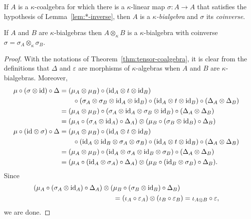 \begin{defn}
    If $A$ is a $\kappa$-coalgebra for which there is a $\kappa$-linear map $\sigma\colon A\to A$ that satisfies the hypothesis of Lemma~\ref{lem:*-inverse}, then $A$ is a \textsl{$\kappa$-bialgebra} and $\sigma$ its \textsl{coinverse}.
\end{defn}

\begin{thm}\label{thm:tensor-bialgebra}
    If\/ $A$ and\/ $B$ are\/ $\kappa$-bialgebras then\/ $A\otimes_\kappa B$ is a\/ $\kappa$-bialgebra with coinverse\/ $\sigma=\sigma_A\otimes_\kappa\sigma_B$.
\end{thm}

\begin{proof}
    With the notations of Theorem~\ref{thm:tensor-coalgebra}, it is clear from the definitions that $\Delta$ and $\varepsilon$ are morphisms of $\kappa$-algebras when $A$ and $B$ are $\kappa$-bialgebras. Moreover,
    \begin{align*}
        \mu\circ(\sigma\otimes\text{\rm id})\circ\Delta
            &= (\mu_A\otimes\mu_B)\circ(\text{\rm id}_A\otimes t\otimes\text{\rm id}_B)\\
            &\qquad\circ(\sigma_A\otimes\sigma_B
                    \otimes\text{\rm id}_A\otimes\text{\rm id}_B)
                \circ(\text{\rm id}_A\otimes t\otimes\text{\rm id}_B)
                \circ(\Delta_A\otimes\Delta_B)\\
            &= (\mu_A\otimes\mu_B)
                \circ(\sigma_A\otimes\text{\rm id}_A
                \otimes\sigma_B\otimes\text{\rm id}_B)
                \circ(\Delta_A\otimes\Delta_B)\\
            &= (\mu_A\circ(\sigma_A\otimes\text{\rm id}_A)\circ\Delta_A)
                \otimes
                (\mu_B\circ(\sigma_B\otimes\text{\rm id}_B)\circ\Delta_B)\\
            \mu\circ(\text{\rm id}\otimes\sigma)\circ\Delta
            &= (\mu_A\otimes\mu_B)\circ(\text{\rm id}_A\otimes t\otimes\text{\rm id}_B)\\
            &\qquad\circ(\text{\rm id}_A\otimes\text{\rm id}_B\otimes
                    \sigma_A\otimes\sigma_B)
                \circ(\text{\rm id}_A\otimes t\otimes\text{\rm id}_B)
                \circ(\Delta_A\otimes\Delta_B)\\
            &= (\mu_A\otimes\mu_B)
                \circ(\text{\rm id}_A\otimes\sigma_A\otimes\text{\rm id}_B\otimes\sigma_B)
                    \circ(\Delta_A\otimes\Delta_B)\\
            &= (\mu_A\circ(\text{\rm id}_A\otimes\sigma_A)\circ\Delta_A)
                \otimes
                (\mu_B\circ(\text{\rm id}_B\otimes\sigma_B)\circ\Delta_B).
    \end{align*}
    Since
    \begin{align*}
        (\mu_A\circ(\sigma_A\otimes\text{\rm id}_A)\circ\Delta_A)
                \otimes
                (&\mu_B\circ(\sigma_B\otimes\text{\rm id}_B)\circ\Delta_B)\\
                &= (\iota_A\circ\varepsilon_A)
                \otimes(\iota_B\circ\varepsilon_B)
                = \iota_{A\otimes B}\circ\varepsilon,
    \end{align*}
    we are done.
\end{proof}

